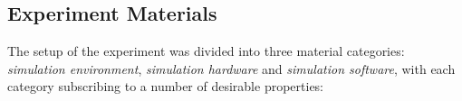 %

\subsection{Experiment Materials}
\label{sec:meth-experiment-setup}
The setup of the experiment was divided into three material categories: \emph{simulation environment}, \emph{simulation hardware} and \emph{simulation software}, with each category subscribing to a number of desirable properties: 

